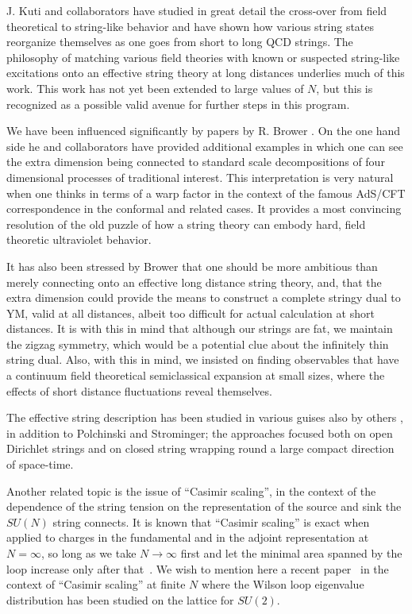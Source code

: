 J. Kuti \cite{kuti} and collaborators have studied in great detail the cross-over
from field theoretical to string-like behavior and have
shown how various
string states reorganize themselves as one goes from short to long
QCD strings. The philosophy of matching various field theories
with known or suspected string-like excitations onto an effective
string theory at long distances underlies much of this work. This
work has not yet been extended to large values of $N$, but this is
recognized as a possible valid avenue for further steps in this
program.

We have been influenced significantly by papers by R. Brower
\cite{brower}. On the one hand side he and collaborators have
provided additional examples in which one can see the extra
dimension being connected to standard scale decompositions of four
dimensional processes of traditional interest. This interpretation
is very natural when one thinks in terms of a warp factor in the
context of the famous AdS/CFT correspondence in the conformal and
related cases. It provides a most convincing resolution of the old
puzzle of how a string theory can embody hard, field theoretic
ultraviolet behavior.

It has also been stressed by Brower that one should be more
ambitious than merely connecting onto an effective long distance
string theory, and, that the extra dimension could provide the
means to construct a complete stringy dual to YM, valid at all
distances, albeit too difficult for actual calculation at short
distances. It is with this in mind that although our strings are
fat, we maintain the zigzag symmetry, which would be a potential
clue about the infinitely thin string dual. Also, with this in
mind, we insisted on finding observables that have a continuum
field theoretical semiclassical expansion at small sizes, where
the effects of short distance fluctuations reveal themselves.

The effective string description has been studied in various
guises also by others \cite{other}, in addition to Polchinski
and Strominger; the approaches focused both on
open Dirichlet strings and on closed string wrapping round a large
compact direction of space-time.

Another related topic is the issue of ``Casimir scaling'', in the
context of the dependence of the string tension on the
representation of the source and sink the $SU(N)$ string connects.
It is known that ``Casimir scaling'' is exact when applied to
charges in the fundamental and in the adjoint representation
at $N=\infty$,
so long as we take $N\to\infty$ first and let the minimal area
spanned by the loop increase only after that~\cite{adlerneu}.
We wish to mention here a recent paper~\cite{negele} in the context
of ``Casimir scaling'' at finite $N$ where the
Wilson loop eigenvalue distribution has been studied on the
lattice for $SU(2)$.

